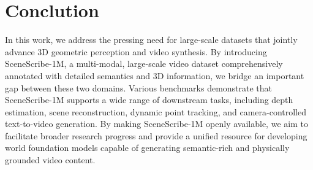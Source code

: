 \section{Conclution}

In this work, we address the pressing need for large-scale datasets that jointly advance 3D geometric perception and video synthesis. By introducing SceneScribe-1M, a multi-modal, large-scale video dataset comprehensively annotated with detailed semantics and 3D information, we bridge an important gap between these two domains. Various benchmarks demonstrate that SceneScribe-1M supports a wide range of downstream tasks, including depth estimation, scene reconstruction, dynamic point tracking, and camera-controlled text-to-video generation. By making SceneScribe-1M openly available, we aim to facilitate broader research progress and provide a unified resource for developing world foundation models capable of generating semantic-rich and physically grounded video content.
\newpage
